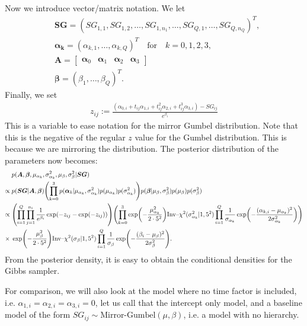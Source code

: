 \documentclass{article}\usepackage[]{graphicx}\usepackage[]{color}
\begin{document}
Now we introduce vector/matrix notation. We let 
\begin{align*}
    &\bm{SG} = (SG_{1,1},SG_{1,2},\ldots,SG_{1,n_1},\ldots, SG_{Q,1},\ldots,SG_{Q,n_Q})^T, \\
    &\bm{\alpha_k} = (\alpha_{k,1},\ldots,\alpha_{k,Q})^T \quad \text{for}\quad  k = 0,1,2,3,\\
    &\bm{A} = \begin{bmatrix}
    \bm{\alpha}_0 & \bm{\alpha}_1 & \bm{\alpha}_2 & \bm{\alpha}_3
\end{bmatrix} \\
    &\bm{\beta} = (\beta_1,\ldots,\beta_Q)^T.
\end{align*}
Finally, we set
\begin{align*}
    z_{ij}:= \frac{(\alpha_{0,i} + t_{ij}\alpha_{1,i} + t_{ij}^2\alpha_{2,i} + t_{ij}^3\alpha_{3,i})-SG_{ij}}{e^{\beta_i}}
\end{align*}
This is a variable to ease notation for the mirror Gumbel distribution. Note that this is the negative of the regular $z$ value for the Gumbel distribution. This is because we are mirroring the distribution.
The posterior distribution of the parameters now becomes:
\begin{align*}
    &p(\bm{A}, \bm{\beta}, \mu_{\alpha_k},\sigma^2_{\alpha_k},\mu_\beta,\sigma^2_\beta|\bm{SG})\\
    \propto\;&p(\bm{SG}|\bm{A}, \bm{\beta})\qty(\prod_{k=0}^3p(\bm{\alpha}_k|\mu_{\alpha_k},\sigma^2_{\alpha_k})p(\mu_{\alpha_k})p(\sigma^2_{\alpha_k}))p(\bm{\beta}|\mu_\beta,\sigma^2_\beta)p(\mu_\beta)p(\sigma^2_\beta) \\
    \propto\;& \qty(\prod_{i=1}^Q\prod_{j=1}^{n_i}\frac{1}{e^{\beta_i}}\exp(-z_{ij}-\exp(-z_{ij})))\qty(\prod_{k=0}^3\exp(-\frac{\mu_{\alpha_k}^2}{2\cdot5^2})\text{Inv–}\chi^2(\sigma^2_{\alpha_k}|1,5^2)\prod_{i=1}^{Q}\frac{1}{\sigma_{\alpha_k}}\exp(-\frac{(\alpha_{k,i}-\mu_{\alpha_k})^2}{2\sigma_{\alpha_k}^2})) \\
    \times\;&\exp(-\frac{\mu_\beta^2}{2\cdot5^2})\text{Inv–}\chi^2(\sigma_\beta|1,5^2)\prod_{i=1}^Q\frac{1}{\sigma_\beta}\exp(-\frac{(\beta_i-\mu_\beta)^2}{2\sigma_\beta^2}).
\end{align*}
From the posterior density, it is easy to obtain the conditional densities for the Gibbs sampler.
\medskip\par
For comparison, we will also look at the model where no time factor is included, i.e. $\alpha_{1,i} = \alpha_{2,i} = \alpha_{3,i} = 0$, let us call that the intercept only model, and a baseline model of the form $SG_{ij} \sim \text{Mirror-Gumbel}(\mu,\beta)$, i.e. a model with no hierarchy. 
\end{document}

